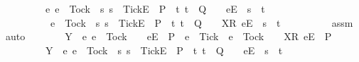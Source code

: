 \begin{isabellebody}
\ \ \ \ \ \ \ \ {\isasymunion}\ {\isacharbraceleft}e{\isachardot}\ e\ {\isasymnoteq}\ Tock\ {\isasymand}\ {\isacharparenleft}{\isasymexists}s{\isachardot}\ s\ {\isacharat}\ {\isacharbrackleft}{\isacharbrackleft}Tick{\isacharbrackright}\isactrlsub E{\isacharbrackright}\ {\isasymin}\ P\ {\isasymand}\ {\isacharparenleft}{\isasymexists}t{\isachardot}\ t\ {\isasymin}\ Q\ {\isasymand}\ {\isasymrho}\ {\isacharat}\ {\isacharbrackleft}{\isacharbrackleft}e{\isacharbrackright}\isactrlsub E{\isacharbrackright}\ {\isacharequal}\ s\ {\isacharat}\ t{\isacharparenright}{\isacharparenright}\ {\isasymor}\isanewline
\ \ \ \ \ \ \ \ \ \ e\ {\isacharequal}\ Tock\ {\isasymand}\ {\isacharparenleft}{\isasymexists}s{\isachardot}\ s\ {\isacharat}\ {\isacharbrackleft}{\isacharbrackleft}Tick{\isacharbrackright}\isactrlsub E{\isacharbrackright}\ {\isasymin}\ P\ {\isasymand}\ {\isacharparenleft}{\isasymexists}t{\isachardot}\ t\ {\isasymin}\ Q\ {\isasymand}\ {\isasymrho}\ {\isacharat}\ {\isacharbrackleft}{\isacharbrackleft}X{\isacharbrackright}\isactrlsub R{\isacharcomma}\ {\isacharbrackleft}e{\isacharbrackright}\isactrlsub E{\isacharbrackright}\ {\isacharequal}\ s\ {\isacharat}\ t{\isacharparenright}{\isacharparenright}{\isacharbraceright}{\isacharparenright}\ {\isacharequal}\ {\isacharbraceleft}{\isacharbraceright}{\isachardoublequoteclose}\isanewline
\ \ \ \ \ \ \isamarkupfalse%
\ assm{}\ \isamarkupfalse%
\ auto\isanewline
\ \ \ \ \isamarkupfalse%
\ \isamarkupfalse%
\ {\isachardoublequoteopen}{\isacharparenleft}Y\ {\isasyminter}\ {\isacharbraceleft}e{\isachardot}\ e\ {\isasymnoteq}\ Tock\ {\isasymand}\ {\isasymrho}\ {\isacharat}\ {\isacharbrackleft}{\isacharbrackleft}e{\isacharbrackright}\isactrlsub E{\isacharbrackright}\ {\isasymin}\ P\ {\isasymand}\ e\ {\isasymnoteq}\ Tick\ {\isasymor}\ e\ {\isacharequal}\ Tock\ {\isasymand}\ {\isasymrho}\ {\isacharat}\ {\isacharbrackleft}{\isacharbrackleft}X{\isacharbrackright}\isactrlsub R{\isacharcomma}\ {\isacharbrackleft}e{\isacharbrackright}\isactrlsub E{\isacharbrackright}\ {\isasymin}\ P{\isacharbraceright}{\isacharparenright}\isanewline
\ \ \ \ \ \ \ \ {\isasymunion}\ {\isacharparenleft}Y\ {\isasyminter}\ {\isacharbraceleft}e{\isachardot}\ e\ {\isasymnoteq}\ Tock\ {\isasymand}\ {\isacharparenleft}{\isasymexists}s{\isachardot}\ s\ {\isacharat}\ {\isacharbrackleft}{\isacharbrackleft}Tick{\isacharbrackright}\isactrlsub E{\isacharbrackright}\ {\isasymin}\ P\ {\isasymand}\ {\isacharparenleft}{\isasymexists}t{\isachardot}\ t\ {\isasymin}\ Q\ {\isasymand}\ {\isasymrho}\ {\isacharat}\ {\isacharbrackleft}{\isacharbrackleft}e{\isacharbrackright}\isactrlsub E{\isacharbrackright}\ {\isacharequal}\ s\ {\isacharat}\ t{\isacharparenright}{\isacharparenright}\ {\isasymor}\isanewline

\end{isabellebody}
